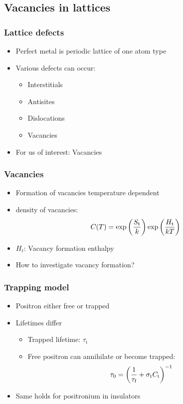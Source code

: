 \documentclass[english, fleqn]{beamer}
\begin{document}
\subsection{Vacancies in lattices}

\begin{frame}
    \frametitle{Lattice defects}
    \begin{itemize}
        \item 
            Perfect metal is periodic lattice of one atom type
        \pause
        \item
            Various defects can occur:
            \begin{itemize}
                \item
                    Interstitials
                \item
                    Antisites
                \item
                    Dislocations
                \item
                    Vacancies
            \end{itemize}
        \pause
        \item
            For us of interest: Vacancies
    \end{itemize}
\end{frame}

\begin{frame}
    \frametitle{Vacancies}
    \begin{itemize}
        \item
            Formation of vacancies temperature dependent
        \pause
        \item
            density of vacancies:
            \[
                C(T)=\exp\left( \frac{S_\text{t}}k \right)\exp\left( \frac{H_\text{t}}{kT} \right)
            \]
        \pause
        \item
            $H_t$: Vacancy formation enthalpy
        \pause
        \item
            How to investigate vacancy formation?
   \end{itemize}
\end{frame}

\begin{frame}
    \frametitle{Trapping model}
    \begin{itemize}
        \item 
            Positron either free or trapped
        \item
            Lifetimes differ
            \begin{itemize}
                \item 
                    Trapped lifetime: $\tau_\text{t}$
                \item 
                    Free positron can annihilate or become trapped: 
                    \[
                        \tau_0 = \left( \frac1{\tau_\text{f}}
                        + \sigma_\text{t}C_\text{t} \right)^{-1}
                    \]
            \end{itemize}
        \item
            Same holds for positronium in insulators
    \end{itemize}
\end{frame}
\end{document}
